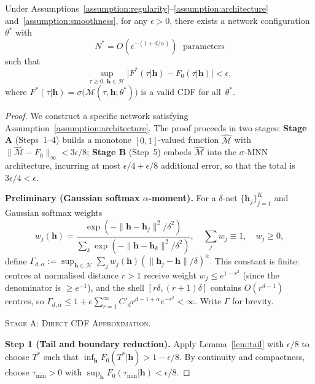 \begin{theorem}
\label{thm:universal_approx}
Under Assumptions~\ref{assumption:regularity}--\ref{assumption:architecture}
and~\ref{assumption:smoothness}, for any $\epsilon > 0$, there exists a
network configuration $\theta^*$ with
\[
N^* = O\!\left(\epsilon^{-(1+d/\alpha)}\right) \;\text{ parameters}
\]
such that
\[
\sup_{\tau \geq 0,\, \boldsymbol{h} \in \mathcal{H}}
\bigl|F^*(\tau|\boldsymbol{h}) - F_0(\tau|\boldsymbol{h})\bigr| < \epsilon,
\]
where $F^*(\tau|\boldsymbol{h}) = \sigma\!\bigl(\mathcal{M}(\tau,\boldsymbol{h};\theta^*)\bigr)$
is a valid CDF for all~$\theta^*$.
\end{theorem}

\begin{proof}
We construct a specific network satisfying Assumption~\ref{assumption:architecture}.
The proof proceeds in two stages: \textbf{Stage A} (Steps~1--4) builds a monotone
$[0,1]$-valued function $\hat{\mathcal{M}}$ with
$\|\hat{\mathcal{M}} - F_0\|_\infty < 3\epsilon/8$;
\textbf{Stage B} (Step~5) embeds $\hat{\mathcal{M}}$ into the $\sigma$-MNN
architecture, incurring at most $\epsilon/4 + \epsilon/8$ additional error,
so that the total is $3\epsilon/4 < \epsilon$.

\medskip\noindent\textbf{Preliminary (Gaussian softmax $\alpha$-moment).}
For a $\delta$-net $\{\boldsymbol{h}_j\}_{j=1}^K$ and Gaussian softmax weights
\[
w_j(\boldsymbol{h})
= \frac{\exp(-\|\boldsymbol{h}-\boldsymbol{h}_j\|^2/\delta^2)}
       {\sum_{k} \exp(-\|\boldsymbol{h}-\boldsymbol{h}_k\|^2/\delta^2)},
\quad \sum_j w_j \equiv 1, \quad w_j \geq 0,
\]
define $\Gamma_{d,\alpha}
:= \sup_{\boldsymbol{h}\in\mathcal{H}}\sum_j w_j(\boldsymbol{h})
   (\|\boldsymbol{h}_j-\boldsymbol{h}\|/\delta)^\alpha$.
This constant is finite: centres at normalised distance $r > 1$ receive weight
$w_j \leq e^{1-r^2}$ (since the denominator is $\geq e^{-1}$), and the shell
$[r\delta, (r+1)\delta]$ contains $O(r^{d-1})$ centres, so
$\Gamma_{d,\alpha} \leq 1 + e\sum_{r=1}^\infty C'_d r^{d-1+\alpha} e^{-r^2} < \infty$.
Write $\Gamma$ for brevity.

\medskip\noindent\textsc{Stage A: Direct CDF Approximation.}

\textbf{Step 1 (Tail and boundary reduction).}
Apply Lemma~\ref{lem:tail} with $\epsilon/8$ to choose $T^*$ such that
$\inf_{\boldsymbol{h}} F_0(T^*|\boldsymbol{h}) > 1 - \epsilon/8$.
By continuity and compactness, choose $\tau_{\min} > 0$ with
$\sup_{\boldsymbol{h}} F_0(\tau_{\min}|\boldsymbol{h}) < \epsilon/8$.


\end{proof}
